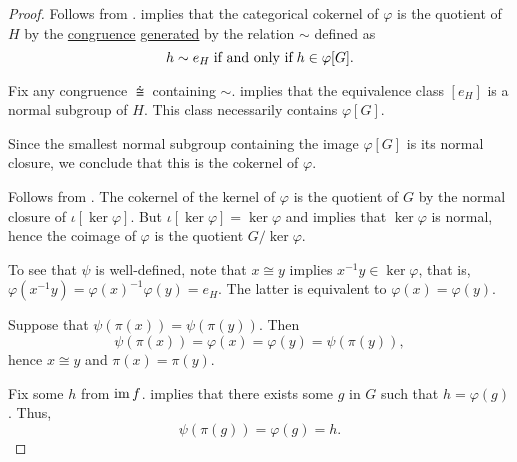 \begin{proof}
   Follows from .
    implies that the categorical cokernel of \( \varphi \) is the quotient of \( H \) by the \hyperref[def:first_order_congruence]{congruence} \hyperref[def:first_order_generated_congruence]{generated} by the relation \( {\sim} \) defined as
  \begin{equation*}
    h \sim e_H \T{if and only if} h \in \varphi[G].
  \end{equation*}

  Fix any congruence \( {\congdot} \) containing \( {\sim} \).  implies that the equivalence class \( [e_H] \) is a normal subgroup of \( H \). This class necessarily contains \( \varphi[G] \).

  Since the smallest normal subgroup containing the image \( \varphi[G] \) is its normal closure, we conclude that this is the cokernel of \( \varphi \).

   Follows from .
   The cokernel of the kernel of \( \varphi \) is the quotient of \( G \) by the normal closure of \( \iota[\ker \varphi] \). But \( \iota[\ker \varphi] = \ker \varphi \) and  implies that \( \ker \varphi \) is normal, hence the coimage of \( \varphi \) is the quotient \( G / \ker \varphi \).

   To see that \( \psi \) is well-defined, note that \( x \cong y \) implies \( x^{-1}y \in \ker \varphi \), that is, \( \varphi(x^{-1}y) = \varphi(x)^{-1} \varphi(y) = e_H \). The latter is equivalent to \( \varphi(x) = \varphi(y) \).

   Suppose that \( \psi(\pi(x)) = \psi(\pi(y)) \). Then
  \begin{equation*}
    \psi(\pi(x)) = \varphi(x) = \varphi(y) = \psi(\pi(y)),
  \end{equation*}
  hence \( x \cong y \) and \( \pi(x) = \pi(y) \).

   Fix some \( h \) from \( \operatorname{im} f \).  implies that there exists some \( g \) in \( G \) such that \( h = \varphi(g) \). Thus,
  \begin{equation*}
    \psi(\pi(g)) = \varphi(g) = h.
  \end{equation*}
\end{proof}

